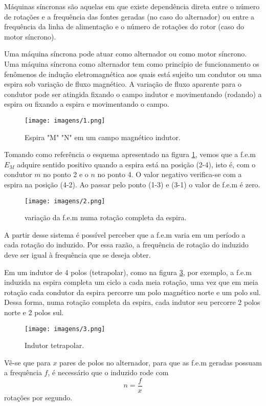
Máquinas síncronas são aquelas em que existe dependência direta entre o número de rotações e a frequência das fontes geradas (no caso do alternador) ou entre a frequência da linha de alimentação e o número de rotações do rotor (caso do motor síncrono).

Uma máquina síncrona pode atuar como alternador ou como motor síncrono. Uma máquina síncrona como alternador tem como princípio de funcionamento os fenômenos de indução eletromagnética aos quais está sujeito um condutor ou uma espira sob variação de fluxo magnético. A variação de fluxo aparente para o condutor pode ser atingida fixando o campo indutor e movimentando (rodando) a espira ou fixando a espira e movimentando o campo.

\begin{figure}[ht!]
\center 
\texttt{[image: imagens/1.png]}
\caption{Espira "M" "N" em um campo magnético indutor.}\label{fig:1}
\end{figure}

Tomando como referência o esquema apresentado na figura \ref{fig:1}, vemos que a f.e.m $E_{M}$ adquire sentido positivo quando a espira está na posição (2-4), isto é, com o condutor $m$ no ponto 2 e o $n$ no ponto 4. O valor negativo verifica-se com a espira na posição (4-2). Ao passar pelo ponto (1-3) e (3-1) o valor de f.e.m é zero. 

\begin{figure}[ht!]
\center 
\texttt{[image: imagens/2.png]}
\caption{variação da f.e.m numa rotação completa da espira.}\label{fig:2}
\end{figure}

A partir desse sistema é possível perceber que a f.e.m varia em um período a cada rotação do induzido. Por essa razão, a frequência de rotação do induzido deve ser igual à frequência que se deseja obter.

Em um indutor de 4 polos (tetrapolar), como na figura \ref{fig:3}, por exemplo, a f.e.m induzida na espira completa um ciclo a cada meia rotação, uma vez que em meia rotação cada condutor da espira percorre um polo magnético norte e um polo sul. Dessa forma, numa rotação completa da espira, cada indutor seu percorre 2 polos norte e 2 polos sul.

\begin{figure}[ht!]
\center 
\texttt{[image: imagens/3.png]}
\caption{Indutor tetrapolar.}\label{fig:3}
\end{figure}

Vê-se que para $x$ pares de polos no alternador, para que as f.e.m geradas possuam a frequência $f$, é necessário que o induzido rode com $$n = \frac{f}{x}$$ rotações por segundo.


